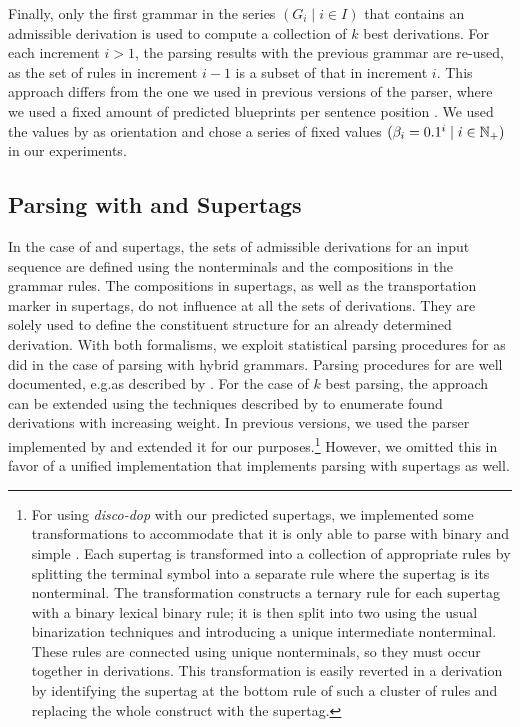 \documentclass[../../document.tex]{subfiles}
\begin{document}
    Finally, only the first grammar in the series \((G_i \mid i \in I)\) that contains an admissible derivation is used to compute a collection of \(k\) best derivations.
    For each increment \(i > 1\), the parsing results with the previous grammar are re-used, as the set of rules in increment \(i-1\) is a subset of that in increment \(i\).
    This approach differs from the one we used in previous versions of the parser, where we used a fixed amount of predicted blueprints per sentence position \citep{RupMoe21, Rup22}.
    We used the values by \citet{Clark04} as orientation and chose a series of fixed values \((\beta_i = 0.1^i \mid i \in \mathbb{N}_+)\) in our experiments.

    \subsection{Parsing with  and  Supertags}\label{sec:parsing:lcfrs}
    In the case of  and  supertags, the sets of admissible derivations for an input sequence are defined using the nonterminals and the  compositions in the grammar rules.
    The  compositions in  supertags, as well as the transportation marker in  supertags, do not influence at all the sets of derivations.
    They are solely used to define the constituent structure for an already determined derivation.
    With both formalisms, we exploit statistical parsing procedures for  as \citet{Geb20} did in the case of parsing with hybrid grammars.
    Parsing procedures for  are well documented, e.g.\@ as described by \citet[Section~7.1]{Kal10}.
    For the case of \(k\) best parsing, the approach can be extended using the techniques described by \citet{HuaChia05} to enumerate found derivations with increasing weight.
    In previous versions, we used the  parser implemented by \citet{CraSchBod16} and extended it for our purposes.\footnote{
        For using \emph{disco-dop} with our predicted supertags, we implemented some transformations to accommodate that it is only able to parse with binary and simple .
        Each supertag is transformed into a collection of appropriate rules by splitting the terminal symbol into a separate rule where the supertag is its  nonterminal.
        The transformation constructs a ternary rule for each supertag with a binary lexical binary rule; it is then split into two using the usual binarization techniques and introducing a unique intermediate nonterminal.
        These rules are connected using unique nonterminals, so they must occur together in derivations.
        This transformation is easily reverted in a derivation by identifying the supertag at the bottom rule of such a cluster of rules and replacing the whole construct with the supertag.
    }
    However, we omitted this in favor of a unified implementation that implements parsing with  supertags as well.
\end{document}
